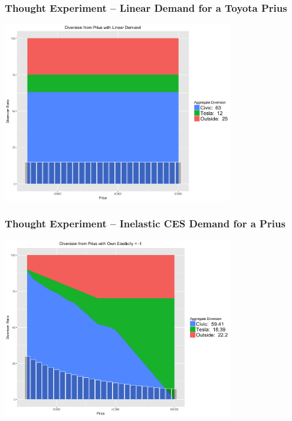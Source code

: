 \documentclass[xcolor=pdftex,dvipsnames,table,mathserif,aspectratio=169]{beamer}
\begin{document}

\begin{frame}
\frametitle{Thought Experiment -- Linear Demand for a Toyota Prius}
\begin{center}
\includegraphics[width=4in]{./resources/new_prius_linear.png}
\end{center}
\end{frame}

\begin{frame}
\frametitle{Thought Experiment -- Inelastic CES Demand for a Prius}
\begin{center}
\includegraphics[width=4in]{./resources/new_prius1.png}
\end{center}
\end{frame}
\end{document}
